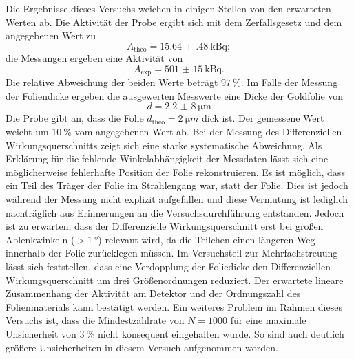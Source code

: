 %
%
Die Ergebnisse dieses Versuchs weichen in einigen Stellen von den erwarteten Werten ab.
Die Aktivität der Probe ergibt sich mit dem Zerfallsgesetz und dem angegebenen Wert zu
\begin{equation*}
	A_{\text{theo}} = \SI{15.64(48)}{\kilo\becquerel};
\end{equation*}
die Messungen ergeben eine Aktivität von
\begin{equation*}
	A_{\text{exp}}= \SI{501(15)}{\kilo\becquerel}.
\end{equation*}
Die relative Abweichung der beiden Werte beträgt $\SI{97}{\%}$.
Im Falle der Messung der Foliendicke ergeben die ausgewerten Messwerte eine Dicke der Goldfolie von
\begin{equation*}
    d = \SI{2,2(8)}{\micro \meter}
\end{equation*}
Die Probe gibt an, dass die Folie $d_{\text{theo}} =\SI{2}{\micro m}$ dick ist.
Der gemessene Wert weicht um $\SI{10}{\%}$ vom angegebenen Wert ab.
Bei der Messung des Differenziellen Wirkungsquerschnitts zeigt sich eine starke systematische Abweichung.
Als Erklärung für die fehlende Winkelabhängigkeit der Messdaten lässt sich eine möglicherweise fehlerhafte Position der Folie rekonstruieren.
Es ist möglich, dass ein Teil des Träger der Folie im Strahlengang war, statt der Folie.
Dies ist jedoch während der Messung nicht explizit aufgefallen und diese Vermutung ist lediglich nachträglich aus Erinnerungen an die Versuchsdurchführung entstanden.
Jedoch ist zu erwarten, dass der Differenzielle Wirkungsquerschnitt erst bei großen Ablenkwinkeln ($>\SI{1}{°}$) relevant wird, da die Teilchen einen längeren Weg innerhalb der Folie zurücklegen müssen.
Im Versuchsteil zur Mehrfachstreuung lässt sich feststellen, dass eine Verdopplung der Foliedicke den Differenziellen Wirkungsquerschnitt um drei Größenordnungen reduziert.
Der erwartete lineare Zusammenhang der Aktivität am Detektor und der Ordnungszahl des Folienmaterials kann bestätigt werden.
Ein weiteres Problem im Rahmen dieses Versuchs ist, dass die Mindestzählrate von $N=1000$ für eine maximale Unsicherheit von $\SI{3}{\%}$ nicht konsequent eingehalten wurde.
So sind auch deutlich größere Unsicherheiten in diesem Versuch aufgenommen worden.
